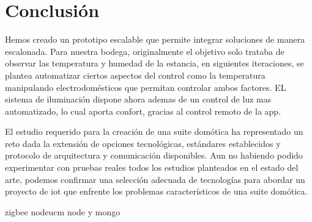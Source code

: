 \cleardoublepage

\chapter{Conclusión}
\label{makereference7}

Hemos creado un prototipo escalable que permite integrar soluciones de manera escalonada. Para nuestra bodega, originalmente el objetivo solo trataba de observar las temperatura y humedad de la estancia, en siguientes iteraciones, se plantea automatizar ciertos aspectos del control como la temperatura manipulando electrodomésticos que permitan controlar ambos factores. EL sistema de iluminación dispone ahora ademas de un control de luz mas automatizado, lo cual aporta confort, gracias al control remoto de la \gls{app}.

El estudio requerido para la creación de una suite domótica ha representado un reto dada la extensión de opciones tecnológicas, estándares establecidos y protocolo de arquitectura y comunicación disponibles. Aun no habiendo podido experimentar con pruebas reales todos los estudios planteados en el estado del arte, podemos confirmar una selección adecuada de tecnologías para abordar un proyecto de \gls{iot} que enfrente los problemas característicos de una suite domótica.

zigbee
nodeucm
node y mongo

